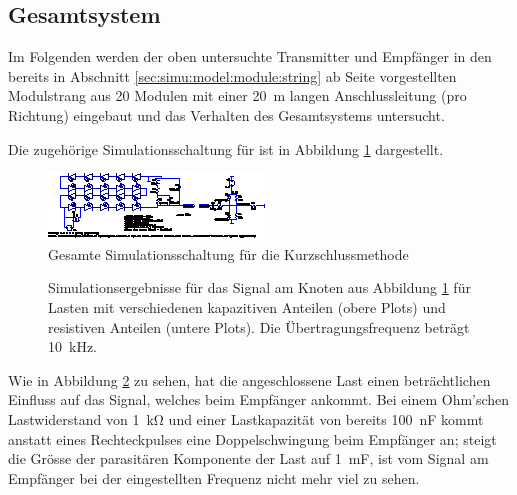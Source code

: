 \clearpage
\subsection{Gesamtsystem}
\label{subsec:simu:ask:total}


Im  Folgenden   werden  der  oben  untersuchte   Transmitter  und  Empf\"anger
in  den  bereits  in  Abschnitt  \ref{sec:simu:model:module:string}  ab  Seite
\pageref{sec:simu:model:module:string}   vorgestellten   Modulstrang  aus   20
Modulen  mit  einer  \SI{20}{\meter} langen  Anschlussleitung  (pro  Richtung)
eingebaut und das Verhalten des Gesamtsystems untersucht.

Die zugeh\"orige  Simulationsschaltung f\"ur   ist  in Abbildung
\ref{fig:ltspice:shortcircuit:complete} dargestellt.

\begin{figure}[h!tb]
    \includegraphics[width=\textwidth]{images/ltspice/jac/shortcircuit.eps}
    \caption{Gesamte Simulationsschaltung f\"ur die Kurzschlussmethode}
    \label{fig:ltspice:shortcircuit:complete}
\end{figure}

\begin{figure}[h!tb]
    \centering
    
    \caption{%
        Simulationsergebnisse  f\"ur  das  Signal  am  Knoten  
        aus  Abbildung  \ref{fig:ltspice:shortcircuit:complete}  f\"ur  Lasten
        mit   verschiedenen    kapazitiven   Anteilen       (obere
        Plots)  und  resistiven   Anteilen    (untere  Plots). Die
        \"Ubertragungsfrequenz betr\"agt \SI{10}{\kilo\hertz}.%
    }
    \label{fig:simu:short:complete}
\end{figure}

Wie   in   Abbildung   \ref{fig:simu:short:complete}   zu   sehen,   hat   die
angeschlossene   Last  einen   betr\"achtlichen  Einfluss   auf  das   Signal,
welches  beim  Empf\"anger  ankommt. Bei einem  Ohm'schen  Lastwiderstand  von
\SI{1}{\kilo\ohm} und einer  Lastkapazit\"at von bereits \SI{100}{\nano\farad}
kommt  anstatt eines  Rechteckpulses  eine  Doppelschwingung beim  Empf\"anger
an;  steigt   die  Gr\"osse   der  parasit\"aren   Komponente  der   Last  auf
\SI{1}{\milli\farad},  ist vom  Signal  am Empf\"anger  bei der  eingestellten
Frequenz nicht mehr viel zu sehen.

